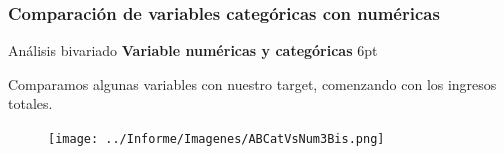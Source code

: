 \documentclass[pdf]{beamer}
\def\vspace{}%
\begin{document}
{    \subsubsection{Comparación de variables categóricas con numéricas}
\begin{frame}{Análisis bivariado}
    \textbf{Variable numéricas y categóricas}
    \vspace{6pt}

    Comparamos algunas variables con nuestro target, comenzando con los ingresos totales.
 
 
 
    \begin{figure}
        \texttt{[image: ../Informe/Imagenes/ABCatVsNum3Bis.png]}
    \end{figure}


\end{frame}}
\end{document}
